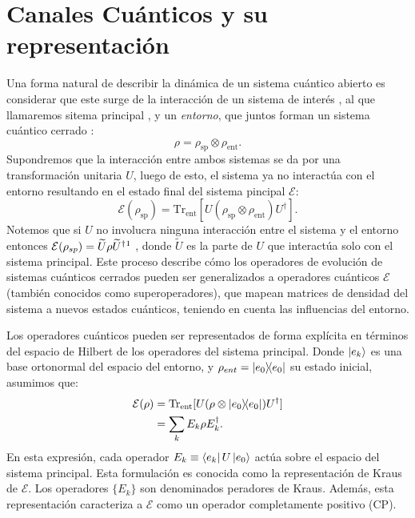 \documentclass[letterpaper,12pt]{thesisECFM}
\theoremstyle{plain}
\theoremstyle{definition}
\theoremstyle{definition}
\theoremstyle{remark}
\newcommand{\1}{\mathbb{1}}
\begin{document}
\section{Canales Cuánticos y su representación} %
Una forma natural de describir la dinámica de un sistema cuántico abierto es considerar que este surge de la interacción de un sistema de interés , al que llamaremos sitema principal , y un \textit{entorno}, que juntos forman un sistema cuántico cerrado \cite{nielsen_chuang_2011}:
\begin{equation}\label{ec:rep_sist_abierto}
    \rho = \rho_{\text{sp}} \otimes \rho_{\text{ent}}.
\end{equation}
Supondremos que la interacción entre ambos sistemas se da por una transformación unitaria $U$, luego de esto, el sistema ya no interactúa con el entorno resultando en el estado final del sistema pincipal $\mathcal{E}$:
\begin{equation}
    \mathcal{E}(\rho_{\text{sp}}) = \text{Tr}_{\text{ent}}[ U( \rho_{\text{sp}} \otimes \rho_{\text{ent}} ) U^\dagger ].
\end{equation}
Notemos que si $U$ no involucra ninguna interacción entre el sistema y el entorno entonces  $\mathcal{E}(\rho_{sp}) =  \widetilde{U} \rho \widetilde{U}^\dagger \footnotemark$ , donde $\widetilde{U}$ es la parte de $U$ que interactúa solo con el sistema principal. Este proceso describe cómo los operadores de evolución de sistemas cuánticos cerrados pueden ser generalizados a operadores cuánticos $\mathcal{E}$ (también conocidos como superoperadores), que mapean matrices de densidad del sistema a nuevos estados cuánticos, teniendo en cuenta las influencias del entorno.

Los operadores cuánticos pueden ser representados de forma explícita en términos del espacio de Hilbert de los operadores del sistema principal. Donde $\ket{e_k}$ es una base ortonormal del espacio del entorno, y $\rho_{ent} = \ketbra{e_0}$ su estado inicial, asumimos que:
\begin{align}
\mathcal{E}(\rho) &= \text{Tr}_{\text{ent}}[ U( \rho \otimes \ketbra{e_0} ) U^\dagger ] \\
&= \sum_k E_k \rho E_k^\dagger.  \label{ec:Canal_Kraus}
\end{align}
En esta expresión, cada operador $E_k \equiv \bra{e_k} U \ket{e_0}$ actúa sobre el espacio del sistema principal. Esta formulación es conocida como la representación de Kraus de $\mathcal{E}$. Los operadores $\{E_k\}$ son denominados peradores de Kraus. Además, esta representación caracteriza a $\mathcal{E}$ como un operador completamente positivo (CP).
\end{document}
